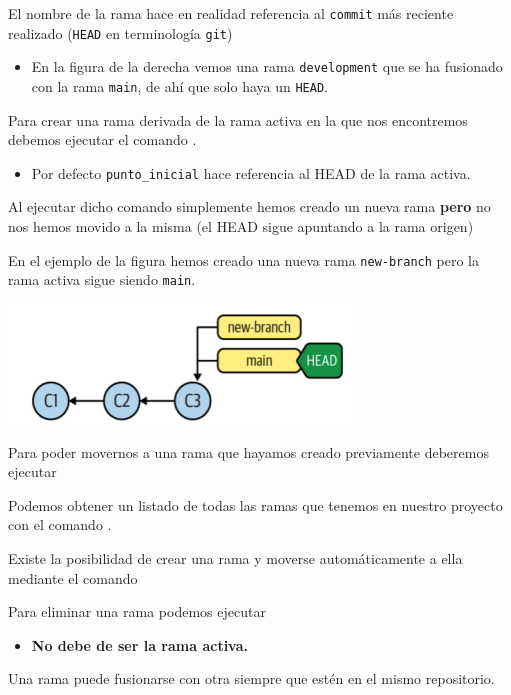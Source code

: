 El nombre de la rama hace en realidad referencia al \texttt{commit} más reciente realizado (\texttt{HEAD} en terminología \texttt{git})
\begin{itemize}
	\item En la figura de la derecha vemos una rama \texttt{development} que se ha fusionado con la rama \texttt{main}, de ahí que solo haya un \texttt{HEAD}.
\end{itemize}
Para crear una rama derivada de la rama activa en la que nos encontremos
debemos ejecutar el comando .
\begin{itemize}
	\item Por defecto \texttt{punto_inicial} hace referencia al HEAD de la rama activa.
\end{itemize}
Al ejecutar dicho comando simplemente hemos creado un nueva rama \textbf{pero} no nos hemos movido a la misma (el HEAD sigue apuntando a la rama origen)

En el ejemplo de la figura hemos creado una nueva rama \texttt{new-branch} pero la rama activa sigue siendo \texttt{main}.
\begin{center}
	\includegraphics{"Temas/Tema 1/screenshot011"}
\end{center}
Para poder movernos a una rama que hayamos creado previamente deberemos ejecutar \linebreak {}

Podemos obtener un listado de todas las ramas que tenemos en nuestro proyecto con el comando .

Existe la posibilidad de crear una rama y moverse automáticamente a ella mediante el comando \linebreak {}

Para eliminar una rama podemos ejecutar 
\begin{itemize}
	\item \textbf{No debe de ser la rama activa.}
\end{itemize}
Una rama puede fusionarse con otra siempre que estén en el mismo repositorio.

